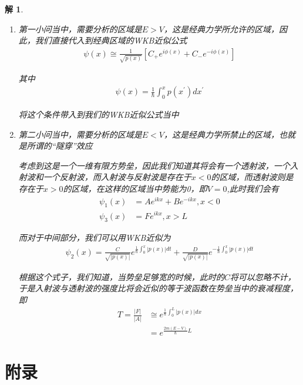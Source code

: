 \documentclass{article}
\newtheorem{solution}{解}
\begin{document}
\begin{solution}
    \begin{enumerate}
        \item 第一小问当中，需要分析的区域是$E>V$，这是经典力学所允许的区域，因此，我们直接代入到经典区域的WKB近似公式
        \begin{align*}
            \psi(x)\cong \frac{1}{\sqrt{p(x)}}\left[C_+e^{i\phi(x)}+C_-e^{-i\phi(x)}\right]
        \end{align*}

        其中
        \begin{align*}
            \psi(x)=\frac{1}{\hbar}\int_{0}^{x}p(x^\prime)dx^\prime
        \end{align*}

        
        
        将这个条件带入到我们的WKB近似公式当中
        \item 第二小问当中，需要分析的区域是$E<V$，这是经典力学所禁止的区域，也就是所谓的“隧穿”效应
        
        考虑到这是一个一维有限方势垒，因此我们知道其将会有一个透射波，一个入射波和一个反射波，而入射波与反射波是存在于$x<0$的区域，而透射波则是存在于$x>0$的区域，在这样的区域当中势能为0，即$V=0$,此时我们会有
        \begin{align*}
            \psi_1(x)&=Ae^{ikx}+Be^{-ikx},x<0\\
            \psi_3(x)&=Fe^{ikx},x>L
        \end{align*}

        而对于中间部分，我们可以用WKB近似为
        \begin{align*}
            \psi_2(x)=\frac{C}{\sqrt{|p(x)|}}e^{\displaystyle\frac{1}{\hbar}\int_{0}^{x}|p(x)|dt}+\frac{D}{\sqrt{|p(x)|}}e^{\displaystyle-\frac{1}{\hbar}\int_{0}^{x}|p(x)|dt}
        \end{align*}

    根据这个式子，我们知道，当势垒足够宽的时候，此时的$C$将可以忽略不计，于是入射波与透射波的强度比将会近似的等于波函数在势垒当中的衰减程度，即
    \begin{align*}
        T=\frac{|F|}{|A|}&\cong  e^{\displaystyle\frac{1}{\hbar}\int_{0}^{L}|p(x)|dx}\\
        &= e^{\displaystyle\frac{2m(E-V)}{\hbar}L}
    \end{align*}
    \end{enumerate}
\end{solution}
























\newpage
\section{附录}
\end{document}
